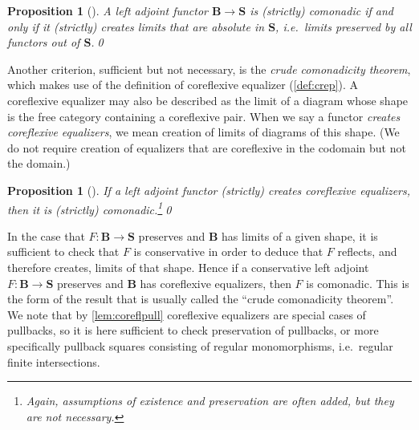 \documentclass[11pt, oneside, article]{memoir}
\theoremstyle{plain}
\newtheorem{proposition}[theorem]{Proposition}
\theoremstyle{definition}
\newtheorem{definition}[def]{Definition}
\theoremstyle{remark}
\newcommand{\cat}[1]{\mathbf{#1}}
\newcommand{\bB}{\cat{B}}
\newcommand{\bD}{\cat{D}}
\newcommand{\bJ}{\cat{J}}
\newcommand{\bS}{\cat{S}}
\begin{document}

\begin{proposition}[{\cite[Theorem 7.3]{pare:absolute}}]\label{prop:comonadicity}
  A left adjoint functor $\bB \to \bS$ is (strictly) comonadic if and
  only if it (strictly) creates limits that are absolute in $\bS$,
  i.e.\ limits preserved by all functors out of $\bS$.\qed
\end{proposition}

Another criterion, sufficient but not necessary, is the \emph{crude
  comonadicity theorem}, which makes use of the definition of
coreflexive equalizer (\cref{def:crep}).
A coreflexive equalizer may also be described as the limit of a
diagram whose shape is the free category containing a coreflexive
pair. When we say a functor \emph{creates coreflexive equalizers}, we
mean creation of limits of diagrams of this shape. (We do not require
creation of equalizers that are coreflexive in the codomain but not
the domain.)

\begin{proposition}[{\cite[Section 3.5]{barr-wells}}]\label{prop:crude}
  If a left adjoint functor (strictly) creates coreflexive equalizers,
  then it is (strictly) comonadic.\footnote{Again, assumptions of
    existence and preservation are often added, but they are not
    necessary.}\qed
\end{proposition}

In the case that $F \colon \bB \to \bS$ preserves and $\bB$ has limits
of a given shape, it is sufficient to check that $F$ is conservative in
order to deduce that $F$ reflects, and therefore creates, limits of that
shape.
Hence if a conservative left adjoint $F \colon \bB \to \bS$ preserves
and $\bB$ has coreflexive equalizers, then $F$ is comonadic. This is
the form of the result that is usually called the ``crude comonadicity
theorem''.
We note that by \cref{lem:coreflpull} coreflexive equalizers are
special cases of pullbacks, so it is here sufficient to check
preservation of pullbacks, or more specifically pullback squares
consisting of regular monomorphisms, i.e.\ regular finite
intersections.
\end{document}
